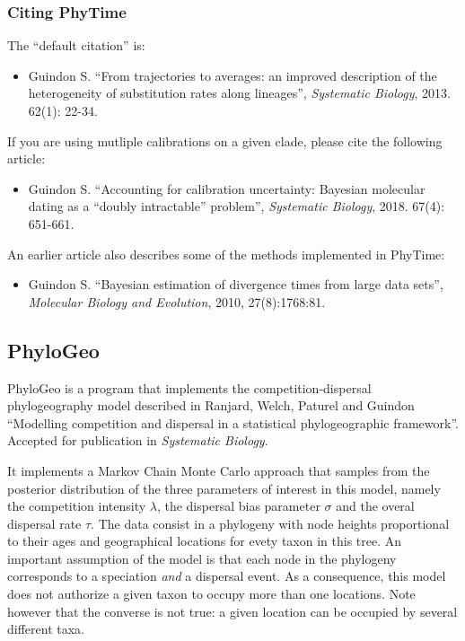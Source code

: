 \documentclass[a4paper,12pt]{article}
\begin{document}
\subsubsection{Citing PhyTime}\label{sec:citephytime}

The ``default citation'' is:

\begin{itemize}
\item Guindon S. ``From trajectories to averages: an improved description of the heterogeneity of
substitution rates along lineages'', {\it Systematic Biology}, 2013. 62(1): 22-34.
\end{itemize}

If you are using mutliple calibrations on a given clade, please cite the following article:
\begin{itemize}
\item Guindon S. ``Accounting for calibration uncertainty: Bayesian molecular dating as a ``doubly intractable'' problem'', {\it Systematic Biology}, 2018. 67(4): 651-661.
\end{itemize}

An earlier article also describes some of the methods implemented in PhyTime:

\begin{itemize}
\item Guindon  S. ``Bayesian estimation of divergence  times from large data  sets'', {\it Molecular
    Biology and Evolution}, 2010,
27(8):1768:81.
\end{itemize}



\subsection{PhyloGeo} PhyloGeo is  a program that implements the
competition-dispersal phylogeography model described in Ranjard, Welch, Paturel and Guindon
``Modelling competition  and  dispersal in a statistical phylogeographic framework''. Accepted for
publication in {\it Systematic Biology}.

It implements a  Markov Chain Monte Carlo  approach that samples from the  posterior distribution of
the three  parameters of  interest in this  model, namely  the competition intensity  $\lambda$, the
dispersal  bias parameter  $\sigma$ and  the overal  dispersal rate  $\tau$. The  data consist  in a
phylogeny with node heights proportional to their ages and geographical locations for evety taxon in
this tree. An important assumption of the model is that each node in the phylogeny corresponds to a
speciation {\em and} a dispersal event. As a consequence, this model does not authorize a given taxon to
occupy more than one locations. Note however that the converse is not true: a given location can be
occupied by several different taxa.
\end{document}

